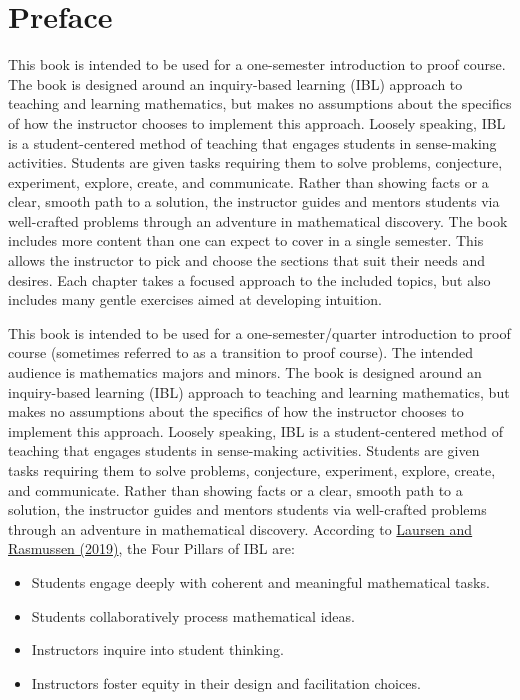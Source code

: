 \chapter*{Preface}

This book is intended to be used for a one-semester introduction to proof course. The book is designed around an inquiry-based learning (IBL) approach to teaching and learning mathematics, but makes no assumptions about the specifics of how the instructor chooses to implement this approach.  Loosely speaking, IBL is a student-centered method of teaching that engages students in sense-making activities.  Students are given tasks requiring them to solve problems, conjecture, experiment, explore, create, and communicate.  Rather than showing facts or a clear, smooth path to a solution, the instructor guides and mentors students via well-crafted problems through an adventure in mathematical discovery. The book includes more content than one can expect to cover in a single semester. This allows the instructor to pick and choose the sections that suit their needs and desires. Each chapter takes a focused approach to the included topics, but also includes many gentle exercises aimed at developing intuition.


This book is intended to be used for a one-semester/quarter introduction to proof course (sometimes referred to as a transition to proof course). The intended audience is mathematics majors and minors. The book is designed around an inquiry-based learning (IBL) approach to teaching and learning mathematics, but makes no assumptions about the specifics of how the instructor chooses to implement this approach.  Loosely speaking, IBL is a student-centered method of teaching that engages students in sense-making activities.  Students are given tasks requiring them to solve problems, conjecture, experiment, explore, create, and communicate.  Rather than showing facts or a clear, smooth path to a solution, the instructor guides and mentors students via well-crafted problems through an adventure in mathematical discovery.  According to \href{https://www.colorado.edu/eer/sites/default/files/attached-files/laursenrasmussencommentaryauthorversion0219.pdf}{Laursen and Rasmussen (2019)}, the Four Pillars of IBL are:
\begin{itemize}
\item Students engage deeply with coherent and meaningful mathematical tasks.
\item Students collaboratively process mathematical ideas.
\item Instructors inquire into student thinking.
\item Instructors foster equity in their design and facilitation choices.
\end{itemize}

